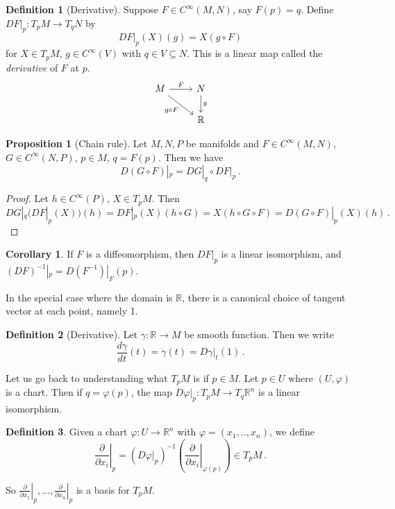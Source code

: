 \documentclass[a4paper,11pt]{article}
\theoremstyle{definition}
\newtheorem*{defn}{Definition}
\newtheorem*{prop}{Proposition}
\newtheorem*{cor}{Corollary}
\numberwithin{equation}{section}
\begin{document}
\begin{defn}[Derivative]
Suppose $F\in C^\infty(M,N)$, say $F(p)=q$. Define $DF|_p:T_pM\rightarrow T_qN$ by 
\[
DF|_p(X)(g)=X(g\circ F)
\]
for $X\in T_pM$, $g\in C^\infty(V)$ with $q\in V\subseteq N$. This is a linear map called the \emph{derivative} of $F$ at $p$.
\[
\begin{tikzcd}
M\arrow[swap]{dr}{g\circ F}\arrow{r}{F}&N\arrow{d}{g}\\
&\mathbb{R}
\end{tikzcd}
\]
\end{defn}

\begin{prop}[Chain rule]
Let $M,N,P$ be manifolds and $F\in C^\infty(M,N)$, $G\in C^\infty(N,P)$, $p\in M$, $q=F(p)$. Then we have
\[
D(G\circ F)|_p=DG|_q\circ DF|_p\,.
\]
\end{prop}

\begin{proof}
Let $h\in C^\infty(P)$, $X\in T_pM$. Then
\[
DG|_q(DF|_p(X))(h)=DF|_p(X)(h\circ G)=X(h\circ G \circ F)=D(G\circ F)|_p(X)(h)\,.
\]
\end{proof}

\begin{cor}
If $F$ is a diffeomorphism, then $DF|_p$ is a linear isomorphism, and $(DF)^{-1}|_p=D(F^{-1})|_F(p)$.
\end{cor}

In the special case where the domain is $\mathbb{R}$, there is a canonical choice of tangent vector at each point, namely 1.

\begin{defn}[Derivative]
Let $\gamma:\mathbb{R}\rightarrow M$ be smooth function. Then we write
\[
\frac{d\gamma}{dt}(t)=\dot{\gamma}(t)=D\gamma|_t(1)\,.
\]
\end{defn}

Let us go back to understanding what $T_pM$ is if $p\in M$. Let $p\in U$ where $(U,\varphi)$ is a chart. Then if $q=\varphi(p)$, the map $D\varphi|_p:T_pM\rightarrow T_q\mathbb{R}^n$ is a linear isomorphism.

\begin{defn}
Given a chart $\varphi:U\rightarrow\mathbb{R}^n$ with $\varphi=(x_1,..,x_n)$, we define 
\[
\left.\frac{\partial}{\partial x_i}\right|_p=(D\varphi|_p)^{-1}\left(\left.\frac{\partial}{\partial x_i}\right|_{\varphi(p)}\right)\in T_pM\,.
\]
\end{defn}

So $\left.\frac{\partial}{\partial x_1}\right|_p,...,\left.\frac{\partial}{\partial x_n}\right|_p$ is a basis for $T_pM$.
\end{document}
